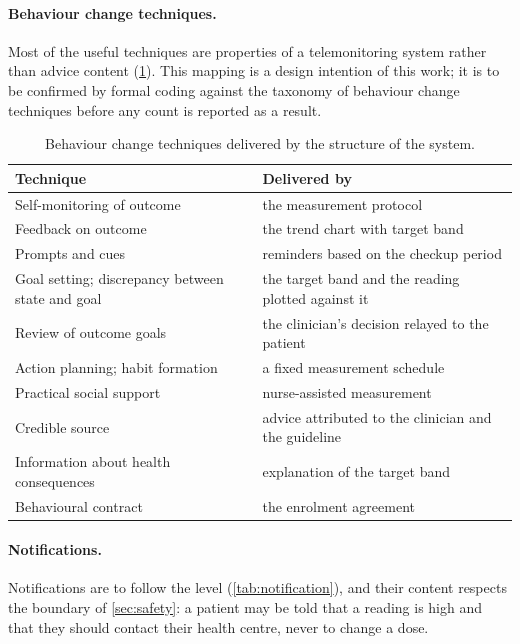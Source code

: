 \paragraph{Behaviour change techniques.} Most of the useful techniques are properties of a telemonitoring system rather than advice content (\cref{tab:bct-mapping}). This mapping is a design intention of this work; it is to be confirmed by formal coding against the taxonomy of behaviour change techniques before any count is reported as a result.

\begin{table}[htbp]
\centering\small
\caption{Behaviour change techniques delivered by the structure of the system.}\label{tab:bct-mapping}
\begin{tabularx}{\textwidth}{@{}>{\raggedright\arraybackslash}p{6.0cm} X@{}}
\toprule
\textbf{Technique} & \textbf{Delivered by} \\
\midrule
Self-monitoring of outcome & the measurement protocol \\
Feedback on outcome & the trend chart with target band \\
Prompts and cues & reminders based on the checkup period \\
Goal setting; discrepancy between state and goal & the target band and the reading plotted against it \\
Review of outcome goals & the clinician's decision relayed to the patient \\
Action planning; habit formation & a fixed measurement schedule \\
Practical social support & nurse-assisted measurement \\
Credible source & advice attributed to the clinician and the guideline \\
Information about health consequences & explanation of the target band \\
Behavioural contract & the enrolment agreement \\
\bottomrule
\end{tabularx}
\end{table}

\paragraph{Notifications.} Notifications are to follow the level (\cref{tab:notification}), and their content respects the boundary of \cref{sec:safety}: a patient may be told that a reading is high and that they should contact their health centre, never to change a dose.

